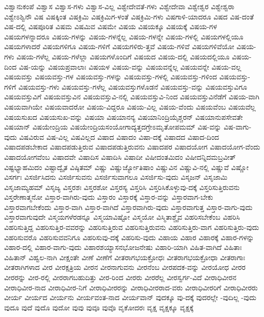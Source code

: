 {ವಿಶ್ವಾನುಕಂಪೆ
ವಿಶ್ವಾಸ
ವಿಶ್ವಾಸ-ಗಳು
ವಿಶ್ವಾಸ-ವಿಲ್ಲ
ವಿಶ್ವೇದೇವತೆ-ಗಳು
ವಿಶ್ವೇದೇವಾ
ವಿಶ್ವೇಶ್ವರ
ವಿಶ್ವೇಶ್ವರಾ
ವಿಶ್ವೇಽಶ್ವಿನೌ
ವಿಷ
ವಿಷಕ್ಕಿಂತ
ವಿಷಕ್ರಿಮಿ
ವಿಷಕ್ರಿಮಿಗ-ಳಂತೆ
ವಿಷಕ್ರಿಮಿ-ಗಳು
ವಿಷಗಾಳಿ-ಯಾದರೂ
ವಿಷದ
ವಿಷ-ದಂತೆ
ವಿಷ-ದಲ್ಲಿ
ವಿಷಪೂರಿತ
ವಿಷಮ
ವಿಷಮಿವ
ವಿಷಮೇ
ವಿಷಯ
ವಿಷಯಕ್ಕೂ
ವಿಷಯಕ್ಕೆ
ವಿಷಯ-ಗಳ
ವಿಷಯಗಳನ್ನಾದರೂ
ವಿಷಯ-ಗಳನ್ನು
ವಿಷಯ-ಗಳನ್ನೆಲ್ಲ
ವಿಷಯ-ಗಳನ್ನೇ
ವಿಷಯ-ಗಳಲ್ಲಿ
ವಿಷಯಗಳಲ್ಲಿಯೂ
ವಿಷಯಗಳಾದರೆ
ವಿಷಯಗಳಿಗೂ
ವಿಷಯ-ಗಳಿಗೆ
ವಿಷಯಗಳಿರು-ತ್ತವೆ
ವಿಷಯ-ಗಳಿವೆ
ವಿಷಯಗಳಿವೆಯೋ
ವಿಷಯ-ಗಳು
ವಿಷಯ-ಗಳೆಲ್ಲ
ವಿಷಯ-ಗಳೆಲ್ಲಾ
ವಿಷಯಗಳೊಂದಿಗೆ
ವಿಷಯದ
ವಿಷಯ-ದಲ್ಲಿ
ವಿಷಯದಲ್ಲಿಯೂ
ವಿಷಯ-ದಿಂದ
ವಿಷ-ಯನ್ನು
ವಿಷಯಪ್ರವಾಲಾಃ
ವಿಷಯಳ
ವಿಷಯ-ವನ್ನು
ವಿಷಯವನ್ನೆಲ್ಲ
ವಿಷಯವನ್ನೇ
ವಿಷಯ-ವಲ್ಲ
ವಿಷಯವಸ್ತು
ವಿಷಯವಸ್ತು-ಗಳ
ವಿಷಯವಸ್ತು-ಗಳನ್ನು
ವಿಷಯವಸ್ತು-ಗಳಲ್ಲಿ
ವಿಷಯವಸ್ತು-ಗಳಿಂದ
ವಿಷಯವಸ್ತು-ಗಳಿಗೆ
ವಿಷಯವಸ್ತು-ಗಳು
ವಿಷಯವಸ್ತು-ಗಳೆಲ್ಲ
ವಿಷಯವಸ್ತುಗಳೊಡನೆ
ವಿಷಯವಸ್ತು-ವನ್ನು
ವಿಷಯವಸ್ತುವಿಗೂ
ವಿಷಯವಸ್ತುವಿಗೆ
ವಿಷಯವಸ್ತುವಿನ
ವಿಷಯವಸ್ತುವಿ-ನಲ್ಲಿ
ವಿಷಯವಸ್ತುವಿ-ನಿಂದ
ವಿಷಯವಸ್ತುವಿನೆಡೆಗೆ
ವಿಷಯ-ವಾಗಿ
ವಿಷಯವಾಗಿಯೇ
ವಿಷಯವಾದರೋ
ವಿಷಯ-ವಿದ್ದರೂ
ವಿಷಯ-ವಿಲ್ಲ
ವಿಷಯ-ವೆಂದು
ವಿಷಯವೆಂಬ
ವಿಷಯವೆಲ್ಲ
ವಿಷಯಸುಖದ
ವಿಷಯಸುಖ-ವನ್ನು
ವಿಷಯಾ
ವಿಷಯಾನನ್ಯ
ವಿಷಯಾನಿಂದ್ರಿಯೈಶ್ಚರನ್
ವಿಷಯಾನುಪಸೇವತೇ
ವಿಷಯಾನ್
ವಿಷಯೇಂದ್ರಿಯ
ವಿಷಯೇಂದ್ರಿಯಸಂಯೋಗಾದ್ಯತ್ತದಗ್ರೇಽಮೃತೋಪಮಮ್
ವಿಷ-ವನ್ನು
ವಿಷ-ವಾಗು-ವುದು
ವಿಷವಿರುವ
ವಿಷ-ವಿಲ್ಲ
ವಿಷವಿಲ್ಲದ
ವಿಷಾದ
ವಿಷಾದಂ
ವಿಷಾ-ದಕ್ಕೆ
ವಿಷಾದದ
ವಿಷಾದ-ದಿಂದ
ವಿಷಾದಪಡಬೇಕಾದ
ವಿಷಾದಪಡುತ್ತಿರುವ
ವಿಷಾದಪಡುತ್ತಿರುವನು
ವಿಷಾದಪರ
ವಿಷಾದಯೋಗ
ವಿಷಾದಯೋಗ-ವೆಂದು
ವಿಷಾದಯೋಗವೆಂಬ
ವಿಷಾದವೇ
ವಿಷಾದಿಸ
ವಿಷಾದಿಸಿ
ವಿಷಾದೀ
ವಿಷೀದಂತಮಿದಂ
ವಿಷೀದನ್ನಿದಮಬ್ರವೀತ್
ವಿಷ್ಟಭ್ಯಾಹಮಿದಂ
ವಿಷ್ಟಾದ್ವೈತ
ವಿಷ್ಠಿತಮ್
ವಿಷ್ಣು
ವಿಷ್ಣುರ್ಜ್ಯೋತಿಷಾಂ
ವಿಷ್ಣುವಿನ
ವಿಷ್ಣುವಿ-ನಲ್ಲಿ
ವಿಷ್ಣುವೆ
ವಿಷ್ಣೋ
ವಿಸರ್ಗಃ
ವಿಸರ್ಜಿಸಿದನು
ವಿಸರ್ಜಿಸುವನು
ವಿಸರ್ಜಿಸುವಾಗಲೂ
ವಿಸರ್ಜಿಸು-ವುದು
ವಿಸೃಜನ್
ವಿಸೃಜಾಮಿ
ವಿಸೃಜಾಮ್ಯಹಮ್
ವಿಸೃಜ್ಯ
ವಿಸ್ತರಶಃ
ವಿಸ್ತರಶೋ
ವಿಸ್ತರಸ್ಯ
ವಿಸ್ತರಿಸಿ
ವಿಸ್ತರಿಸಿಕೊಳ್ಳುವು-ದಕ್ಕೆ
ವಿಸ್ತರಿಸುತ್ತಿರುವನು
ವಿಸ್ತರೇಣಾತ್ಮನೋ
ವಿಸ್ತಾರ-ವಾಗಿರು-ವುದು
ವಿಸ್ತಾರಂ
ವಿಸ್ತಾರಕ್ಕೆ
ವಿಸ್ತಾರ-ವನ್ನು
ವಿಸ್ತಾರವಾಗ-ಬೇಕು
ವಿಸ್ತಾರವಾಗಬೇಕೆಂದು
ವಿಸ್ತಾರ-ವಾಗಿ
ವಿಸ್ತಾರ-ವಾಗಿದೆ
ವಿಸ್ತಾರವಾಗಿರು-ವುದು
ವಿಸ್ತಾರವಾಗುತ್ತ
ವಿಸ್ತಾರ-ವಾಗು-ವುದು
ವಿಸ್ತಾರವಾಗುವುದೇ
ವಿಸ್ಮಯಗಳೆರಡನ್ನೂ
ವಿಸ್ಮಯಾವಿಷ್ಟೋ
ವಿಸ್ಮಯೋ
ವಿಸ್ಮಿತಾಶ್ಚೈವ
ವಿಹರಿಸಬೇಕೆಂಬ
ವಿಹರಿಸಿ
ವಿಹರಿಸುತ್ತಿದ್ದ
ವಿಹರಿಸುತ್ತಿರ-ವವರನ್ನು
ವಿಹರಿಸುತ್ತಿರುವ
ವಿಹರಿಸುತ್ತಿರುವನು
ವಿಹರಿಸುತ್ತಿರು-ವಾಗ
ವಿಹರಿಸುತ್ತಿರು-ವುದು
ವಿಹರಿಸುವರೊ
ವಿಹರಿಸುವವನಿಗೂ
ವಿಹರಿಸುವು-ದಕ್ಕೆ
ವಿಹರಿಸು-ವುದು
ವಿಹಾಯ
ವಿಹಾರ
ವಿಹಾರಕ್ಕೆ
ವಿಹಾರ-ಗಳನ್ನು
ವಿಹಾರ-ದಲ್ಲಿ
ವಿಹಾರ-ವಾಗು-ವುದು
ವಿಹಾರಶಯ್ಯಾಸನಭೋಜನೇಷು
ವಿಹಾರಿ-ಯಾಗಿ
ವಿಹಿತ-ವಾಗಿದೆ
ವಿಹಿತಾಃ
ವಿಹಿತಾನ್
ವಿಹ್ವಲ-ನಾಗಿ
ವೀಕ್ಷಂತೇ
ವೀಣೆ
ವೀಣೆಗೆ
ವೀತರಾಗಭಯಕ್ರೋಧಃ
ವೀತರಾಗಭಯಕ್ರೋಧಾ
ವೀತರಾಗಾಃ
ವೀತರಾಗಿಗಳಾದ
ವೀರ
ವೀರಕ್ಷತ್ರಿಯ
ವೀರನ
ವೀರನಾಗುವನು
ವೀರನೆಂಬ
ವೀರಪದಕ-ವನ್ನು
ವೀರಯೋಧ
ವೀರರ
ವೀರರನ್ನು
ವೀರ-ರಲ್ಲಿ
ವೀರರಾಗಬಹುದಿತ್ತು
ವೀರ-ರಿಂದ
ವೀರರು
ವೀರರೆಲ್ಲ
ವೀರಸ್ವರ್ಗ-ವಿದೆ
ವೀರಾಧಿವೀರನ
ವೀರಾಧಿವೀರ-ನಾದ
ವೀರಾಧಿವೀರ-ನಿಗೆ
ವೀರಾಧಿವೀರರನ್ನು
ವೀರಾಧಿವೀರರಾದ-ವರು
ವೀರಾಧಿವೀರರಿಗೆ
ವೀರಾಧಿವೀರರು
ವೀರ್ಯ
ವೀರ್ಯದ
ವೀರ್ಯನು
ವೀರ್ಯವಂತ-ನಾದ
ವೀರ್ಯವಾನ್
ವುದಕ್ಕೂ
ವು-ದಕ್ಕೆ
ವುದರಲ್ಲೇ
-ವುದಿಲ್ಲ
-ವುದು
ವುದೂ
ವುದೆ
ವುದೊ
ವುದೋ
ವುವು
ವುವೂ
ವುವೊ
ವೃಕೋದರಃ
ವೃಕ್ಷ
ವೃಕ್ಷಕ್ಕೂ
ವೃಕ್ಷಕ್ಕೆ
}
